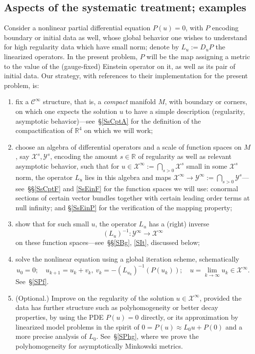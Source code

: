 \documentclass[reqno,11pt,letterpaper]{amsart}
\makeatletter
\newcommand{\myitem}[3]{\item[#2]\def\@currentlabel{#3}\label{#1}}
\numberwithin{equation}{section}
\numberwithin{figure}{section}
\theoremstyle{definition}
\theoremstyle{remark}
\newcommand{\mc}{\mathcal}
\newcommand{\cC}{\mc C}
\newcommand{\cX}{\mc X}
\newcommand{\cY}{\mc Y}
\newcommand{\R}{\mathbb{R}}
\newcommand{\CI}{\cC^\infty}
\makeatother
\begin{document}
\subsection{Aspects of the systematic treatment; examples}
\label{SsISys}

Consider a nonlinear partial differential equation $P(u)=0$, with $P$ encoding boundary or initial data as well, whose global behavior one wishes to understand for high regularity data which have small norm; denote by $L_u:=D_u P$ the linearized operators. In the present problem, $P$ will be the map assigning a metric to the value of the (gauge-fixed) Einstein operator on it, as well as its pair of initial data. Our strategy, with references to their implementation for the present problem, is:
\begin{enumerate}
\myitem{ItISysSmooth}{1.}{1} fix a $\CI$ structure, that is, a \emph{compact} manifold $M$, with boundary or corners, on which one expects the solution $u$ to have a simple description (regularity, asymptotic behavior)---see~\S\ref{SsCptA} for the definition of the compactification of $\R^4$ on which we will work;
\myitem{ItISysAlg}{2.}{2} choose an algebra of differential operators and a scale of function spaces on $M$, say $\cX^s,\cY^s$, encoding the amount $s\in\R$ of regularity as well as relevant asymptotic behavior, such that for $u\in\cX^\infty:=\bigcap_{s>0}\cX^s$ small in some $\cX^s$ norm, the operator $L_u$ lies in this algebra and maps $\cX^\infty\to\cY^\infty:=\bigcap_{s>0}\cY^s$---see~\S\S\ref{SsCptF} and \ref{SsEinF} for the function spaces we will use: conormal sections of certain vector bundles together with certain leading order terms at null infinity; and \S\ref{SsEinP} for the verification of the mapping property;
\myitem{ItISysMap}{3.}{3} show that for such small $u$, the operator $L_u$ has a (right) inverse
  \begin{equation}
  \label{EqISysMap}
    (L_u)^{-1}\colon\cY^\infty\to\cX^\infty
  \end{equation}
  on these function spaces---see~\S\S\ref{SBg}, \ref{SIt}, discussed below;
\myitem{ItISysSolv}{4.}{4} solve the nonlinear equation using a global iteration scheme, schematically
  \begin{equation}
  \label{EqISysSolv}
    u_0=0;\quad u_{k+1}=u_k+v_k,\ v_k=-(L_{u_k})^{-1}(P(u_k));\quad u=\lim_{k\to\infty} u_k\in\cX^\infty.
  \end{equation}
  See~\S\ref{SPf}.
\myitem{ItISysMore}{5.}{5} (Optional.) Improve on the regularity of the solution $u\in\cX^\infty$, provided the data has further structure such as polyhomogeneity or better decay properties, by using the PDE $P(u)=0$ directly, or its approximation by linearized model problems in the spirit of $0=P(u)\approx L_0 u+P(0)$ and a more precise analysis of $L_0$. See~\S\ref{SPhg}, where we prove the polyhomogeneity for asymptotically Minkowski metrics.
\end{enumerate}
\end{document}
